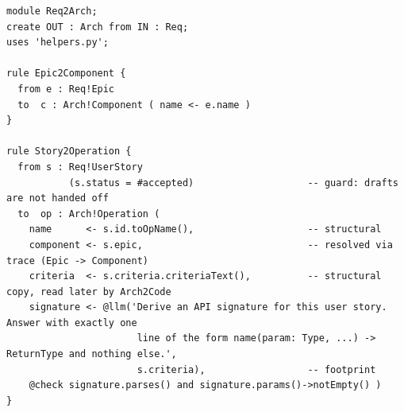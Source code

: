\documentclass[10pt,a4paper]{article}
\newcommand{\file}[1]{\texttt{#1}}
\begin{document}
\begin{lstlisting}[language=ATL, style=model, caption={Code excerpt: \file{templates/devteam/rules/Req2Arch.agenthot}.}, label={lst:req2arch}]
module Req2Arch;
create OUT : Arch from IN : Req;
uses 'helpers.py';

rule Epic2Component {
  from e : Req!Epic
  to  c : Arch!Component ( name <- e.name )
}

rule Story2Operation {
  from s : Req!UserStory
           (s.status = #accepted)                    -- guard: drafts are not handed off
  to  op : Arch!Operation (
    name      <- s.id.toOpName(),                    -- structural
    component <- s.epic,                             -- resolved via trace (Epic -> Component)
    criteria  <- s.criteria.criteriaText(),          -- structural copy, read later by Arch2Code
    signature <- @llm('Derive an API signature for this user story. Answer with exactly one
                       line of the form name(param: Type, ...) -> ReturnType and nothing else.',
                       s.criteria),                  -- footprint
    @check signature.parses() and signature.params()->notEmpty() )
}
\end{lstlisting}
\end{document}
